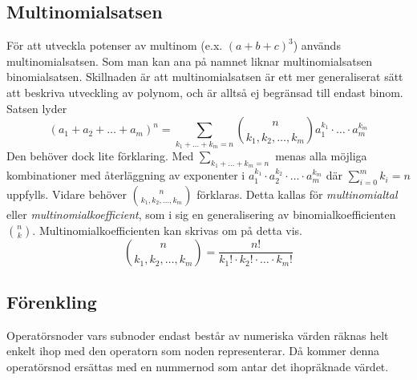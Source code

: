 \documentclass[12pt,a4paper]{article}
\begin{document}
\subsection{Multinomialsatsen}
För att utveckla potenser av multinom (e.x. \((a + b + c)^{3}\)) används multinomialsatsen. Som man kan ana på namnet liknar multinomialsatsen binomialsatsen. Skillnaden är att multinomialsatsen är ett mer generaliserat sätt att beskriva utveckling av polynom, och är alltså ej begränsad till endast binom. Satsen lyder
\[(a_{1}+a_{2}+\ldots+a_{m})^{n}=\displaystyle\sum_{k_{1}+\dots+k_{m}=n}\binom{n}{k_{1},k_{2},\dots,k_{m}}a_{1}^{k_{1}}\cdot\ldots\cdot a_{m}^{k_{m}}\]
Den behöver dock lite förklaring. Med \(\displaystyle\sum_{k_{1}+\dots+k_{m}=n}\) menas alla möjliga kombinationer med återläggning av exponenter i \(a_{1}^{k_{1}}\cdot a_{2}^{k_{2}}\cdot\ldots\cdot a_{m}^{k_{m}}\) där \(\displaystyle\sum_{i=0}^{m}k_{i}=n\) uppfylls. Vidare behöver  \(\binom{n}{k_{1},k_{2},\ldots,k_{m}}\) förklaras. Detta kallas för \textit{multinomialtal} eller \textit{multinomialkoefficient}, som i sig en generalisering av binomialkoefficienten \(\binom{n}{k}\). Multinomialkoefficienten kan skrivas om på detta vis.
\[\binom{n}{k_{1},k_{2},\ldots,k_{m}}=\frac{n!}{k_{1}!\cdot k_{2}!\cdot\ldots\cdot k_{m}!}\]
\subsection{Förenkling}
Operatörsnoder vars subnoder endast består av numeriska värden räknas helt enkelt ihop med den operatorn som noden representerar. Då kommer denna operatörsnod ersättas med en nummernod som antar det ihopräknade värdet.
\end{document}
